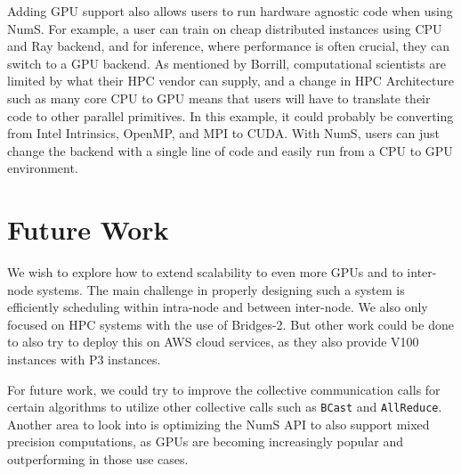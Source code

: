 \documentclass{article}
\begin{document}
Adding GPU support also allows users to run hardware agnostic code when using NumS. For example, a user can train on cheap distributed instances using CPU and Ray backend, and for inference, where performance is often crucial, they can switch to a GPU backend. As mentioned by Borrill, computational scientists are limited by what their HPC vendor can supply, and a change in HPC Architecture such as many core CPU to GPU means that users will have to translate their code to other parallel primitives. \cite{borrill} In this example, it could probably be converting from Intel Intrinsics, OpenMP, and MPI to CUDA. With NumS, users can just change the backend with a single line of code and easily run from a CPU to GPU environment.

\section{Future Work}
We wish to explore how to extend scalability to even more GPUs and to inter-node systems. The main challenge in properly designing such a system is efficiently scheduling within intra-node and between inter-node. We also only focused on HPC systems with the use of Bridges-2. But other work could be done to also try to deploy this on AWS cloud services, as they also provide V100 instances with P3 instances. 

For future work, we could try to improve the collective communication calls for certain algorithms to utilize other collective calls such as \verb|BCast| and \verb|AllReduce|. Another area to look into is optimizing the NumS API to also support mixed precision computations, as GPUs are becoming increasingly popular and outperforming in those use cases. 


 
\end{document}
